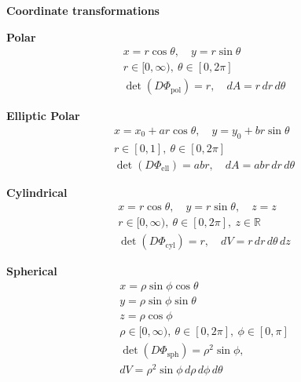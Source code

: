 \documentclass[11pt]{report}
\theoremstyle{definition}
\theoremstyle{plain}
\theoremstyle{remark}
\newcommand{\R}{\mathbb{R}}
\begin{document}
\begin{center}

\begin{minipage}{0.48\textwidth}
\textbf{Coordinate transformations}

\begin{tcolorbox}[width=\textwidth, colframe=black, colback=white]
\textbf{Polar}
\begin{gather*}
x = r\cos\theta,\quad y = r\sin\theta \\
r\in[0,\infty),\ \theta\in[0,2\pi] \\
\det(D\Phi_{\mathrm{pol}})=r,\quad dA=r\,dr\,d\theta
\end{gather*}
\end{tcolorbox}

\vspace{0.3em}

\begin{tcolorbox}[width=\textwidth, colframe=black, colback=white]
\textbf{Elliptic Polar}
\begin{gather*}
x = x_0 + ar\cos\theta,\quad y = y_0 + br\sin\theta \\
r\in[0,1],\ \theta\in[0,2\pi] \\
\det(D\Phi_{\mathrm{ell}})=abr,\quad dA=abr\,dr\,d\theta
\end{gather*}
\end{tcolorbox}

\vspace{0.3em}

\begin{tcolorbox}[width=\textwidth, colframe=black, colback=white]
\textbf{Cylindrical}
\begin{gather*}
x = r\cos\theta,\quad y = r\sin\theta,\quad z=z \\
r\in[0,\infty),\ \theta\in[0,2\pi],\ z\in\R \\
\det(D\Phi_{\mathrm{cyl}})=r,\quad dV=r\,dr\,d\theta\,dz
\end{gather*}
\end{tcolorbox}

\vspace{0.3em}

\begin{tcolorbox}[width=\textwidth, colframe=black, colback=white]
\textbf{Spherical}
\begin{gather*}
x = \rho\sin\phi\cos\theta \\
y = \rho\sin\phi\sin\theta \\
z = \rho\cos\phi \\
\rho\in[0,\infty),\ \theta\in[0,2\pi],\ \phi\in[0,\pi] \\
\det(D\Phi_{\mathrm{sph}})=\rho^2\sin\phi,\quad\\
dV=\rho^2\sin\phi\,d\rho\,d\phi\,d\theta
\end{gather*}
\end{tcolorbox}


\end{minipage}
\end{center}
\end{document}
